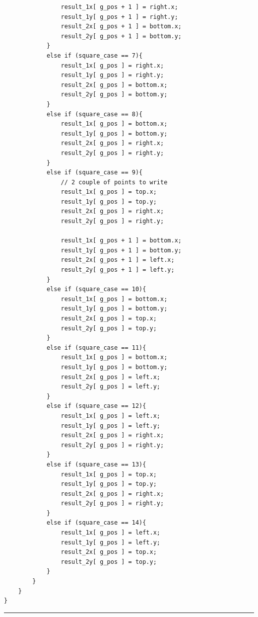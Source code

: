 \documentclass[12pt,a4paper]{report}
\begin{document}
{\begin{lstlisting}
                result_1x[ g_pos + 1 ] = right.x;
                result_1y[ g_pos + 1 ] = right.y;
                result_2x[ g_pos + 1 ] = bottom.x;
                result_2y[ g_pos + 1 ] = bottom.y; 
            }
            else if (square_case == 7){
                result_1x[ g_pos ] = right.x;
                result_1y[ g_pos ] = right.y;
                result_2x[ g_pos ] = bottom.x;
                result_2y[ g_pos ] = bottom.y; 
            }
            else if (square_case == 8){
                result_1x[ g_pos ] = bottom.x;
                result_1y[ g_pos ] = bottom.y;
                result_2x[ g_pos ] = right.x;
                result_2y[ g_pos ] = right.y; 
            }
            else if (square_case == 9){
                // 2 couple of points to write
                result_1x[ g_pos ] = top.x;
                result_1y[ g_pos ] = top.y;
                result_2x[ g_pos ] = right.x;
                result_2y[ g_pos ] = right.y; 

                result_1x[ g_pos + 1 ] = bottom.x;
                result_1y[ g_pos + 1 ] = bottom.y;
                result_2x[ g_pos + 1 ] = left.x;
                result_2y[ g_pos + 1 ] = left.y; 
            }
            else if (square_case == 10){
                result_1x[ g_pos ] = bottom.x;
                result_1y[ g_pos ] = bottom.y;
                result_2x[ g_pos ] = top.x;
                result_2y[ g_pos ] = top.y; 
            }
            else if (square_case == 11){
                result_1x[ g_pos ] = bottom.x;
                result_1y[ g_pos ] = bottom.y;
                result_2x[ g_pos ] = left.x;
                result_2y[ g_pos ] = left.y; 
            }
            else if (square_case == 12){
                result_1x[ g_pos ] = left.x;
                result_1y[ g_pos ] = left.y;
                result_2x[ g_pos ] = right.x;
                result_2y[ g_pos ] = right.y; 
            }
            else if (square_case == 13){
                result_1x[ g_pos ] = top.x;
                result_1y[ g_pos ] = top.y;
                result_2x[ g_pos ] = right.x;
                result_2y[ g_pos ] = right.y; 
            }
            else if (square_case == 14){
                result_1x[ g_pos ] = left.x;
                result_1y[ g_pos ] = left.y;
                result_2x[ g_pos ] = top.x;
                result_2y[ g_pos ] = top.y; 
            }              
        }
    } 
}
\end{lstlisting}
\noindent\rule[0.5ex]{\linewidth}{1pt} \\[10pt]


}
\end{document}

